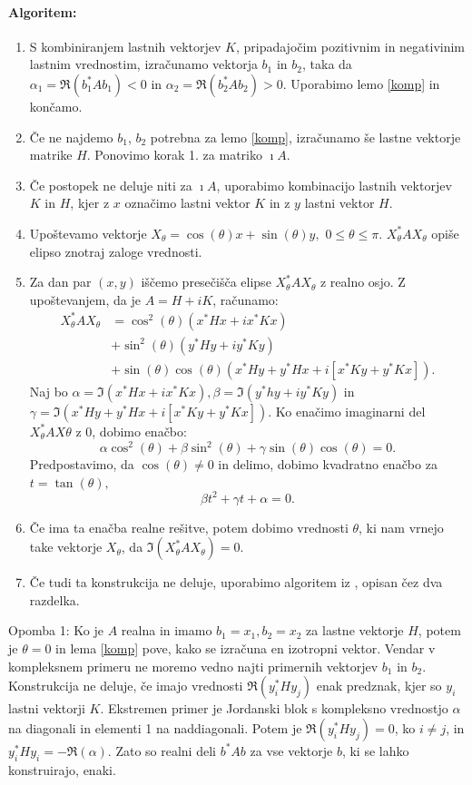 \documentclass[12pt,a4paper]{amsart}
\theoremstyle{definition}
\theoremstyle{plain}
\begin{document}
\paragraph{Algoritem:}
\begin{enumerate}[1.]
\item S kombiniranjem lastnih vektorjev $K$, pripadajočim pozitivnim in negativinim lastnim vrednostim, izračunamo vektorja $b_1$ in $b_2$, taka da  $\alpha_1=\Re(b_1^\ast Ab_1)<0$ in $\alpha_2=\Re(b_2^\ast Ab_2)>0$. Uporabimo lemo \ref{komp} in končamo.
\item Če ne najdemo $b_1$, $b_2$ potrebna za lemo \ref{komp}, izračunamo še lastne vektorje matrike $H$.  Ponovimo korak 1. za matriko $\imath A$.
\item Če postopek ne deluje niti za $\imath A$, uporabimo kombinacijo lastnih vektorjev $K$ in $H$, kjer z $x$ označimo lastni vektor $K$ in z $y$ lastni vektor $H$.
\item Upoštevamo vektorje $X_\theta =\cos(\theta)x+\sin(\theta)y,$ $0\le\theta\le\pi$. $X_\theta ^\ast AX_\theta$ opiše elipso znotraj zaloge vrednosti.
\item Za dan par $(x,y)$ iščemo presečišča elipse $X_\theta ^\ast AX_\theta$ z realno osjo. Z u\-po\-šte\-va\-njem, da je $A=H+iK$, računamo:
\begin{align*}
X_\theta^\ast AX_\theta &= \cos^2(\theta)(x^\ast Hx + ix^\ast Kx)\\ 
&+ \sin^2(\theta)(y^\ast Hy + iy^\ast Ky)\\ 
&+\sin(\theta)\cos(\theta)(x^\ast Hy +y^\ast Hx +i[x^\ast Ky +y^\ast Kx]).
\end{align*}
Naj bo $\alpha=\Im(x^\ast Hx + ix^\ast Kx), \beta=\Im(y^\ast hy +iy^\ast Ky)$ in $\gamma=\Im(x^\ast Hy +y^\ast Hx +i[x^\ast Ky +y^\ast Kx]).$ Ko enačimo imaginarni del $X_\theta ^\ast AX\theta$ z 0, dobimo enačbo:
$$\alpha \cos^2(\theta) +\beta \sin^2(\theta) +\gamma \sin(\theta)\cos(\theta)=0.$$
Predpostavimo, da $\cos(\theta) \not =0$ in delimo, dobimo kvadratno enačbo za $t=\tan(\theta),$
$$\beta t^2 +\gamma t +\alpha =0.$$
\item Če ima ta enačba realne rešitve, potem dobimo vrednosti $\theta$, ki nam vrnejo take vektorje $X_\theta$, da $\Im(X_\theta ^\ast AX_\theta)=0$.
\item Če tudi ta konstrukcija ne deluje, uporabimo algoritem iz \cite{trije}, opisan čez dva razdelka.
\end{enumerate}

Opomba 1: Ko je $A$ realna in imamo $b_1=x_1, b_2=x_2$ za lastne vektorje $H$, potem je $\theta=0$ in lema \ref{komp} pove, kako se izračuna en izotropni vektor. Vendar v kompleksnem primeru ne moremo vedno najti primernih vektorjev $b_1$ in $b_2$. Konstrukcija ne deluje, če imajo vrednosti $\Re(y_i^\ast Hy_j)$ enak predznak, kjer so $y_i$ lastni vektorji $K.$ Ekstremen primer je Jordanski blok s kompleksno vrednostjo $\alpha$ na diagonali in elementi 1 na naddiagonali. Potem je $\Re(y_i^\ast Hy_j)=0$, ko $i\not=j$, in $y_i^\ast Hy_i=-\Re(\alpha)$. Zato so realni deli $b^\ast Ab$ za vse vektorje $b$, ki se lahko konstruirajo, enaki.\\
\end{document}
